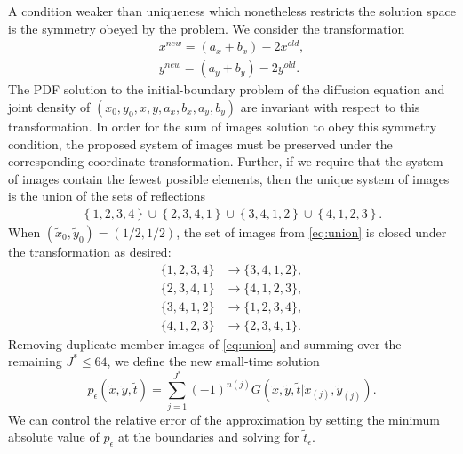 A condition weaker than uniqueness which nonetheless restricts the
solution space is the symmetry obeyed by the problem. We consider the transformation
\begin{align}
  x^{new} = (a_x + b_x) - 2x^{old}, \\
  y^{new} = (a_y + b_y) - 2y^{old}.
\end{align}
The PDF solution to the initial-boundary problem of the diffusion
equation and joint density of $(x_0,y_0,x,y,a_x,b_x,a_y,b_y)$ are
invariant with respect to this transformation. In order for the sum of
images solution to obey this symmetry condition, the proposed system
of images must be preserved under the corresponding coordinate
transformation. Further, if we require that the system of images
contain the fewest possible elements, then the unique system of images
is the union of the sets of reflections
\begin{align}
  \left\{ 1,2,3,4 \right\} \cup \left\{ 2,3,4,1 \right\} \cup \left\{ 3,4,1,2 \right\} \cup \left\{ 4,1,2,3 \right\}. \label{eq:union}
\end{align}
When $(\tilde{x}_0, \tilde{y}_0) = (1/2,1/2)$, the set of
images from \eqref{eq:union} is closed under the transformation as
desired:
\begin{align*}
  \{1,2,3,4 \} & \to \{3,4,1,2 \}, \\
  \{2,3,4,1 \} &\to \{4,1,2,3 \}, \\
  \{3,4,1,2 \} &\to \{1,2,3,4 \}, \\
  \{4,1,2,3 \} &\to \{2,3,4,1 \}.
\end{align*}
Removing duplicate member images of \eqref{eq:union} and summing over
the remaining $J^* \leq 64$, we define the new small-time solution
\begin{equation}
  p_\epsilon(\tilde{x}, \tilde{y}, \tilde{t}) = \sum_{j=1}^{J^*} (-1)^{n(j)}
  G(\tilde{x},\tilde{y},\tilde{t}|\tilde{x}_{(j)},\tilde{y}_{(j)}). \label{eq:small-time-sol}
\end{equation}
We can control the relative error of the approximation by setting the
minimum absolute value of $p_\epsilon$ at the boundaries and solving
for $\tilde{t}_\epsilon$.
